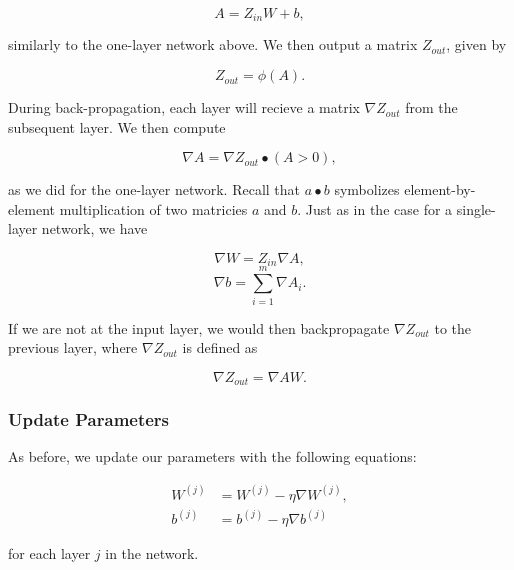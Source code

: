 $$ A = Z_{in} W + b, $$

similarly to the one-layer network above. We then output a matrix $Z_{out}$, given by

$$ Z_{out} = \phi(A).$$

During back-propagation, each layer will recieve a matrix $\nabla Z_{out}$ from
the subsequent layer. We then compute

$$ \nabla A = \nabla Z_{out} \bullet (A > 0), $$

as we did for the one-layer network. Recall that $a \bullet b$ symbolizes
element-by-element multiplication of two matricies $a$ and $b$.  Just as in the
case for a single-layer network, we have

$$ \nabla W = Z_{in} \nabla A, $$
$$ \nabla b = \sum_{i=1}^m \nabla A_i. $$

If we are not at the input layer, we would then backpropagate $\nabla Z_{out}$
to the previous layer, where $\nabla Z_{out}$ is defined as

$$ \nabla Z_{out} = \nabla A W. $$

\subsubsection{Update Parameters}
As before, we update our parameters with the following equations:

\begin{align*}
W^{(j)} &= W^{(j)} - \eta \nabla W^{(j)},\\
b^{(j)} &= b^{(j)} - \eta \nabla b^{(j)}
\end{align*}

for each layer $j$ in the network.

